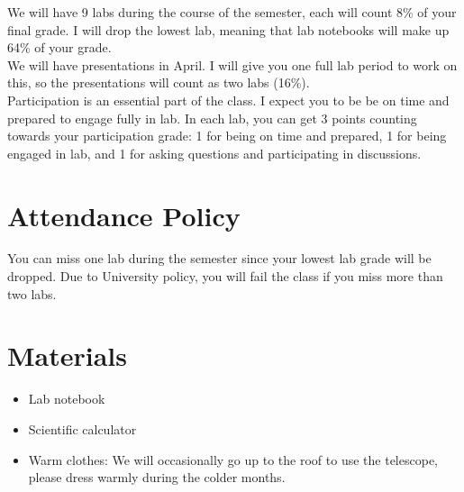 \documentclass[11pt]{article}
\begin{document}
\begin{flushleft}
We will have 9 labs during the course of the semester, each will count 8\% of your final grade.  I will drop the lowest lab, meaning that lab notebooks will make up 64\% of your grade.\\
\vspace{0.1in}
We will have presentations in April. I will give you one full lab period to work on this, so the presentations will count as two labs (16\%).\\ 

\vspace{0.1in}
Participation is an essential part of the class. I expect you to be be on time and prepared to engage fully in lab. In each lab, you can get 3 points counting towards your participation grade:  1 for being on time and prepared, 1 for being engaged in lab, and 1 for asking questions and participating in discussions.  \\

\vspace{0.1in}

\section*{Attendance Policy}
You can miss one lab during the semester since your lowest lab grade will be dropped.  Due to University policy, you will fail the class if you miss more than two labs.


\vspace{0.1in}




\section*{Materials}
\begin{itemize}
\item Lab notebook
\item Scientific calculator
\item Warm clothes:  We will occasionally go up to the roof to use the telescope, please dress warmly during the colder months.
\end{itemize}


\end{flushleft}
\end{document}
